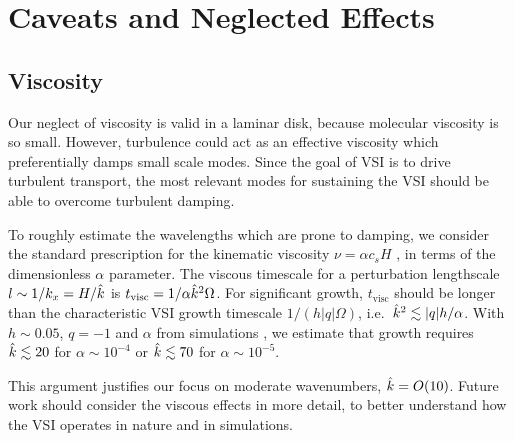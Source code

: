 \section{Caveats and Neglected Effects}\label{caveats} 

\subsection{Viscosity}\label{caveats_visc}

Our neglect of viscosity is valid in a laminar disk, because molecular viscosity is so small.
However, turbulence could act as an effective viscosity which preferentially damps 
small scale modes.   Since the goal of VSI is to drive turbulent transport,
the most relevant modes for sustaining the VSI should be able to overcome
turbulent damping.

To roughly estimate the wavelengths which are prone to damping, we
consider 
the standard
prescription for the kinematic viscosity $\nu = \alpha c_s H$
\citep{shakura73}, in terms of the dimensionless $\alpha$ 
parameter. The viscous timescale for a perturbation lengthscale  
$l\sim 1/k_x = H/\hat{k}$ is $t_\mathrm{visc} = 1/\alpha\hat{k}^2\Omega $. 
For significant growth, $t_\mathrm{visc}$ should be longer than the
characteristic VSI growth timescale $1/(h|q|\Omega)$, i.e.\ 
$\hat{k}^2\lesssim |q|h/\alpha$. With $h \sim 0.05$, $q = -1$  and
 $\alpha$ from simulations \citepalias{nelson13},
we estimate that growth requires $\hat{k}\lesssim 20$ for
$\alpha\sim 10^{-4}$ or $\hat{k}\lesssim 70$ for $\alpha\sim
10^{-5}$. 

This argument justifies our focus on moderate
wavenumbers, $\hat{k}=O(10)$. Future work should consider
the viscous effects in more detail, to better understand
how the VSI operates in nature and in simulations.

